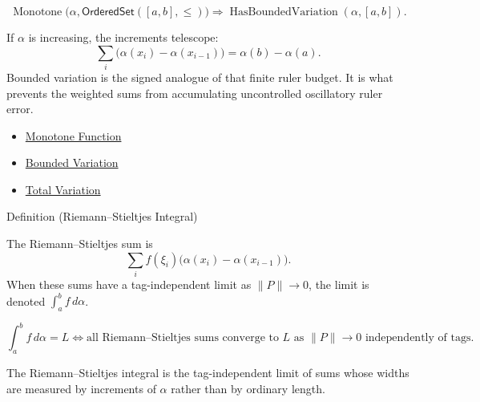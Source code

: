 \begin{remark*}
\[
\operatorname{Monotone}\bigl(\alpha,\mathsf{OrderedSet}([a,b],\leq)\bigr)
\Longrightarrow
\operatorname{HasBoundedVariation}(\alpha,[a,b]).
\]
\end{remark*}

\begin{remark*}[Interpretation]
If \(\alpha\) is increasing, the increments telescope:
\[
  \sum_i\bigl(\alpha(x_i)-\alpha(x_{i-1})\bigr)=\alpha(b)-\alpha(a).
\]
Bounded variation is the signed analogue of that finite ruler budget. It is
what prevents the weighted sums from accumulating uncontrolled oscillatory
ruler error.
\end{remark*}

\begin{dependencies}
\begin{itemize}
  \item \hyperref[def:function-monotone]{Monotone Function}
  \item \hyperref[def:bounded-variation-integration]{Bounded Variation}
  \item \hyperref[def:total-variation]{Total Variation}
\end{itemize}
\end{dependencies}

\begin{definitionbox}{Definition (Riemann--Stieltjes Integral)}
\begin{definition}
\label{def:riemann-stieltjes-integral}
The Riemann--Stieltjes sum is
\[
  \sum_i f(\xi_i)\bigl(\alpha(x_i)-\alpha(x_{i-1})\bigr).
\]
When these sums have a tag-independent limit as \(\|P\|\to0\), the limit is
denoted \(\int_a^b f\,d\alpha\).
\end{definition}
\end{definitionbox}

\begin{remark*}
\[
\int_a^b f\,d\alpha=L
\Longleftrightarrow
\text{all Riemann--Stieltjes sums converge to }L\text{ as }\|P\|\to0
\text{ independently of tags}.
\]
\end{remark*}

\begin{remark*}[Interpretation]
The Riemann--Stieltjes integral is the tag-independent limit of sums whose
widths are measured by increments of \(\alpha\) rather than by ordinary length.
\end{remark*}

